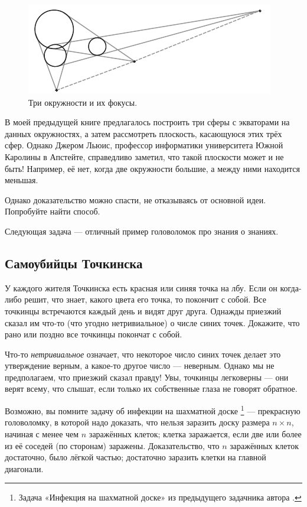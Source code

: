 \begin{figure}[h!]
\centering
\includegraphics[scale=1]{pics/3circs}
\caption{Три окружности и их фокусы.}
\label{pic:3circ}
\end{figure}

В моей предыдущей книге \cite{59} предлагалось построить три сферы с экваторами на данных окружностях, а затем рассмотреть плоскость, касающуюся этих трёх сфер.
Однако Джером Льюис, профессор информатики университета Южной Каролины в Апстейте, справедливо заметил, что такой плоскости может и не быть!
Например, её нет, когда две окружности большие, а между ними находится меньшая.

Однако доказательство можно спасти, не отказываясь от основной идеи.
Попробуйте найти способ.

\medskip

Следующая задача --- отличный пример головоломок про знания о знаниях.

\subsection*{Самоубийцы Точкинска}

У каждого жителя Точкинска есть красная или синяя точка на лбу.
Если он когда-либо решит, что знает, какого цвета его точка, то покончит с собой.
Все точкинцы встречаются каждый день и видят друг друга.
Однажды приезжий сказал им что-то (что угодно нетривиальное) о числе синих точек.
Докажите, что рано или поздно все точкинцы покончат с собой.

Что-то \emph{нетривиальное} означает, что некоторое число синих точек делает это утверждение верным, а какое-то другое число --- неверным.
Однако мы не предполагаем, что приезжий сказал правду!
Увы, точкинцы легковерны --- они верят всему, что слышат, если только их собственные глаза не говорят обратное.

\medskip

Возможно, вы помните задачу об инфекции на шахматной доске%
\footnote{Задача «Инфекция на шахматной доске» из предыдущего задачника автора \cite{59}. \pr} --- прекрасную головоломку, в которой надо доказать, что нельзя заразить доску размера $n \times n$, начиная с менее чем $n$ заражённых клеток;
клетка заражается, если две или более из её соседей (по сторонам) заражены.
Доказательство, что $n$ заражённых клеток достаточно, было лёгкой частью; достаточно заразить клетки на главной диагонали.

